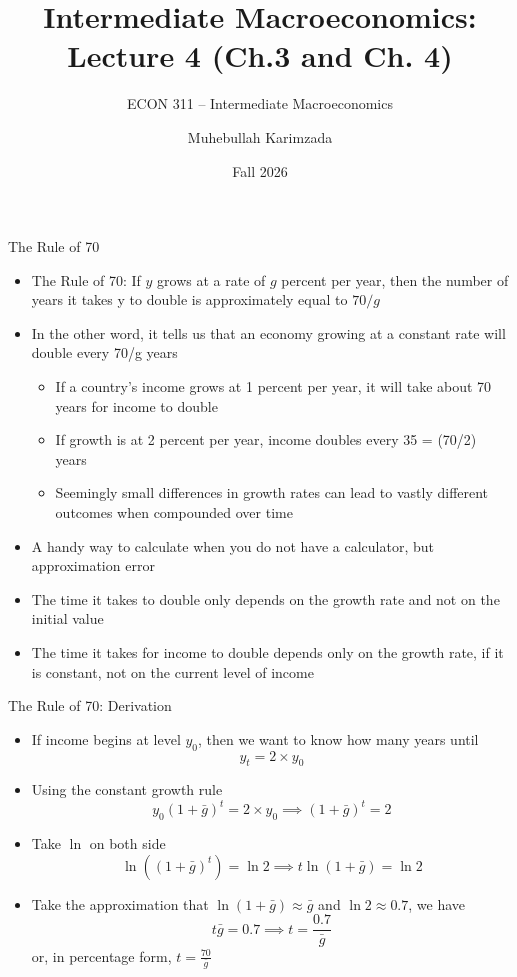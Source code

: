 \documentclass[aspectratio=1610]{beamer}
\title[Fall - Lecture 4] %
{Intermediate Macroeconomics: Lecture  4 (Ch.3 and Ch. 4)}
\subtitle{ECON 311 -- Intermediate Macroeconomics}
\author{Muhebullah Karimzada}
\institute{School of Economics \\\ University of Northern British Columbia}
\date{Fall 2026}
\begin{document}
\begin{frame}[plain]
  \titlepage
\end{frame}


\begin{frame}[wide]{The Rule of 70}
	\begin{itemize}
		\item The Rule of 70: If $y$ grows at a rate of $g$ percent per year, then the number of years it takes y to double is approximately equal to $70/g$
		\item In the other word, it tells us that an economy growing at a constant rate will double every 70/g years
		\begin{itemize}
			\item If a country’s income grows at 1 percent per year, it will take about 70 years for income to double
			\item If growth is at 2 percent per year,	income doubles every 35 = (70/2) years
			\item Seemingly small differences in growth rates can lead to vastly different outcomes when compounded over time
		\end{itemize}
		\item A handy way to calculate when you do not have a calculator, but approximation error
		\item The time it takes to double only depends on the growth rate and not on the initial value
		\item The time it takes for income to double depends only on the growth rate, if it is constant, not on the current level of income
		
	\end{itemize}
\end{frame}

\begin{frame}[wide]{The Rule of 70: Derivation}
	\begin{itemize}
		\item If income begins at level $y_0$, then we want to know how many years until
		\[y_t=2\times y_0\]
		\item Using the constant growth rule
		\[y_0(1+\bar{g})^t =2\times y_0 \implies (1+\bar{g})^t =2  \]
		\item Take $\ln$ on both side
		\[ \ln\left((1+\bar{g})^t\right) =\ln2 \implies t\ln\left(1+\bar{g}\right) =\ln2\]
		\item Take the approximation that $\ln\left(1+\bar{g}\right) \approx \bar{g}$ and $\ln2 \approx 0.7$, we have
		\[t\bar{g} = 0.7 \implies t = \frac{0.7}{\bar{g}}\]
		or, in percentage form,
		$t = \frac{70}{\bar{g}}$
	\end{itemize}
\end{frame}
\end{document}
